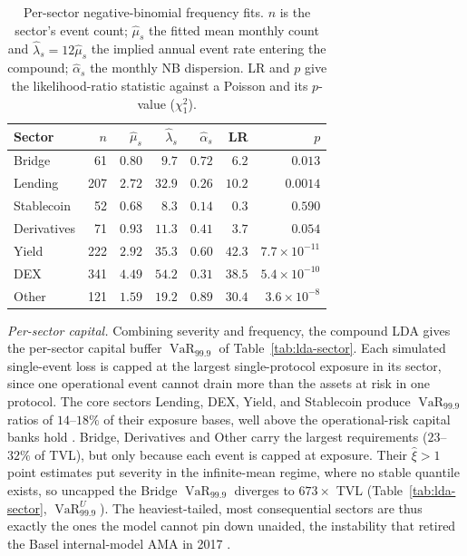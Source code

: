 \documentclass[runningheads]{llncs}
\newcommand{\VaR}{\operatorname{VaR}}
\begin{document}
\begin{table}[tb]
\centering
\caption{Per-sector negative-binomial frequency fits. $n$ is the sector's
event count; $\hat\mu_s$ the fitted mean monthly count and
$\hat\lambda_s = 12\hat\mu_s$ the implied annual event rate entering the
compound; $\hat\alpha_s$ the monthly NB dispersion. LR and $p$ give the likelihood-ratio statistic against a Poisson and its $p$-value
($\chi^2_1$).}
\label{tab:nb}
\small
\begin{tabular}{l r r r r r r}
\toprule
Sector & $n$ & $\hat\mu_s$ & $\hat\lambda_s$ & $\hat\alpha_s$ & LR & $p$ \\
\midrule
Bridge       &  61 & $0.80$ &  $9.7$ & $0.72$ & $6.2$   & $0.013$ \\
Lending      & 207 & $2.72$ & $32.9$ & $0.26$ & $10.2$  & $0.0014$ \\
Stablecoin   &  52 & $0.68$ &  $8.3$ & $0.14$ & $0.3$   & $0.590$ \\
Derivatives  &  71 & $0.93$ & $11.3$ & $0.41$ & $3.7$   & $0.054$ \\
Yield        & 222 & $2.92$ & $35.3$ & $0.60$ & $42.3$  & $7.7\times10^{-11}$ \\
DEX          & 341 & $4.49$ & $54.2$ & $0.31$ & $38.5$  & $5.4\times10^{-10}$ \\
Other        & 121 & $1.59$ & $19.2$ & $0.89$ & $30.4$  & $3.6\times10^{-8}$ \\
\bottomrule
\end{tabular}
\end{table}

\emph{Per-sector capital.} Combining severity and frequency, the
compound LDA gives the per-sector capital buffer $\VaR_{99.9}$ of
Table~\ref{tab:lda-sector}. Each simulated single-event loss is capped
at the largest single-protocol exposure in its sector, since one
operational event cannot drain more than the assets at risk in one
protocol. The core sectors Lending, DEX, Yield, and Stablecoin produce $\VaR_{99.9}$ ratios of
$14$--$18\%$ of their exposure bases, well above the operational-risk
capital banks hold \citep{Fontnouvelle2006}. Bridge, Derivatives and Other carry the largest requirements ($23$--$32\%$ of TVL), but only because each event is capped at exposure. Their
$\hat\xi>1$ point estimates put severity in the infinite-mean regime,
where no stable quantile exists, so uncapped the Bridge $\VaR_{99.9}$
diverges to $673\times$ TVL (Table~\ref{tab:lda-sector},
$\VaR_{99.9}^U$). The heaviest-tailed, most consequential sectors are
thus exactly the ones the model cannot pin down unaided, the instability
that retired the Basel internal-model AMA in 2017 \citep{BCBS2017}.
\end{document}
